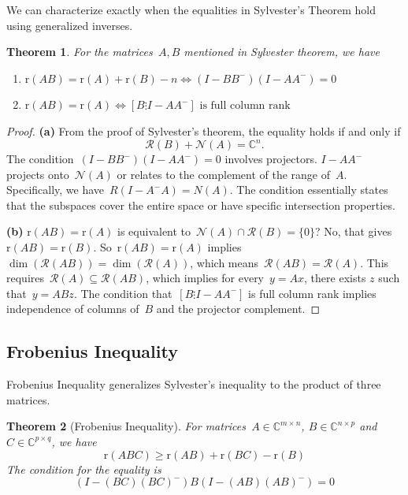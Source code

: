 \documentclass[12pt]{article}
\newtheorem{theorem}{Theorem}[section]
\newcommand{\rank}{\mathrm{r}}
\newcommand{\C}{\mathbb{C}}
\begin{document}
We can characterize exactly when the equalities in Sylvester's Theorem hold using generalized inverses.

\begin{theorem}
For the matrices~$A, B$ mentioned in Sylvester theorem, we have
\begin{enumerate}
    \item[(a)] $\rank(AB) = \rank(A) + \rank(B) - n \iff (I - BB^-)(I - AA^-) = 0$
    \item[(b)] $\rank(AB) = \rank(A) \iff [B \vdots I - AA^-] \text{ is full column rank}$
\end{enumerate}
\end{theorem}

\begin{proof}
\textbf{(a)} From the proof of Sylvester's theorem, the equality holds if and only if 
$$\mathcal{R}(B) + \mathcal{N}(A) = \C^n.$$
The condition~$(I - BB^-)(I - AA^-) = 0$ involves projectors. $I - AA^-$ projects onto~$\mathcal{N}(A)$ or relates to the complement of the range of~$A$. Specifically, we have~$R(I - A^- A) = N(A)$.
The condition essentially states that the subspaces cover the entire space or have specific intersection properties.

\textbf{(b)} $\rank(AB) = \rank(A)$ is equivalent to~$\mathcal{N}(A) \cap \mathcal{R}(B) = \{0\}$? No, that gives~$\rank(AB)=\rank(B)$.
So~$\rank(AB) = \rank(A)$ implies~$\dim(\mathcal{R}(AB)) = \dim(\mathcal{R}(A))$, which means~$\mathcal{R}(AB) = \mathcal{R}(A)$. This requires~$\mathcal{R}(A) \subseteq \mathcal{R}(AB)$, which implies for every~$y = Ax$, there exists $z$ such that~$y = ABz$.
The condition that~$[B \vdots I - AA^-]$ is full column rank implies independence of columns of~$B$ and the projector complement.
\end{proof}

\subsection{Frobenius Inequality}

Frobenius Inequality generalizes Sylvester's inequality to the product of three matrices.

\begin{theorem}[Frobenius Inequality]
For matrices~$A \in \C^{m \times n}$, $B \in \C^{n \times p}$ and~$C \in \C^{p \times q}$, we have
\[
\rank(ABC) \ge \rank(AB) + \rank(BC) - \rank(B)
\]
The condition for the equality is
\[
(I - (BC)(BC)^-)B(I - (AB)(AB)^-) = 0
\]
\end{theorem}
\end{document}
